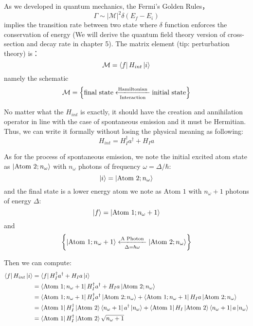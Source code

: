 \documentclass[12pt,openany]{book}
\begin{document}
	As we developed in quantum mechanics, the Fermi's Golden Rules，
	\begin{equation}
		\Gamma\sim|\mathcal{M}|^2\delta(E_f-E_i)
	\end{equation}
	implies the transition rate between two state  where $\delta$ function enforces the
	conservation of energy (We will derive the quantum field theory version of cross-section and decay rate in chapter 5). The matrix element (tip: perturbation theory) is：
	\begin{equation}
		\mathcal{M}=\bra{f}H_{int}\ket{i}
	\end{equation}
	namely the schematic
	\begin{equation}
		\mathcal{M}=\left\{\text{final state}\xlongleftarrow[\text{Interaction}]{\text{Hamiltonian}}\text{initial state}\right\}
	\end{equation}\par 
	No matter what the $H_{int}$ is exactly, it should have the creation and annihilation operator in line with the case of 
	spontaneous emission and it must be Hermitian. Thus, we can write it formally without losing the physical meaning as following:
	\begin{equation}
		H_{int}=H_{I}^{\dagger}a^\dagger+H_{I}a
	\end{equation}\par 
	As for the process of spontaneous emission, we note the initial excited atom state 
	as $\ket{\text{Atom 2};n_\omega}$ with $n_\omega$ photons of frequency $\omega=\Delta/\hbar$:
	\begin{equation}
		\ket{i}=\ket{\text{Atom 2};n_\omega}
	\end{equation}
	and the final state is a lower energy atom we note as $\text{Atom 1}$ with $n_\omega+1$ photons of energy $\Delta$:
	\begin{equation}
		\ket{f}=\ket{\text{Atom 1};n_\omega+1}
	\end{equation}
	and
	\begin{equation}
		\left\{\ket{\text{Atom 1};n_\omega+1}\xlongleftarrow[\Delta=\hbar\omega]{\text{A Photon}}\ket{\text{Atom 2};n_\omega}\right\}
	\end{equation}\par 
	Then we can compute:
	\begin{equation}\label{spc}
		\begin{aligned}
			\bra{f}H_{int}\ket{i}&=\bra{f}H_{I}^{\dagger}a^\dagger+H_{I}a\ket{i}\\
			                     &=\bra{\text{Atom 1};n_\omega+1}H_{I}^{\dagger}a^\dagger+H_{I}a\ket{\text{Atom 2};n_\omega}\\
			                     &=\bra{\text{Atom 1};n_\omega+1}H_{I}^{\dagger}a^\dagger\ket{\text{Atom 2};n_\omega}+\bra{\text{Atom 1};n_\omega+1}H_{I}a\ket{\text{Atom 2};n_\omega}\\
			                     &=\bra{\text{Atom 1}}H_{I}^{\dagger}\ket{\text{Atom 2}}\bra{n_\omega+1}a^\dagger\ket{n_\omega}+\bra{\text{Atom 1}}H_{I}\ket{\text{Atom 2}}\bra{n_\omega+1}a\ket{n_\omega}\\
			                     &=\bra{\text{Atom 1}}H_{I}^{\dagger}\ket{\text{Atom 2}}\sqrt{n_\omega+1}
		\end{aligned}
	\end{equation}
\end{document}
